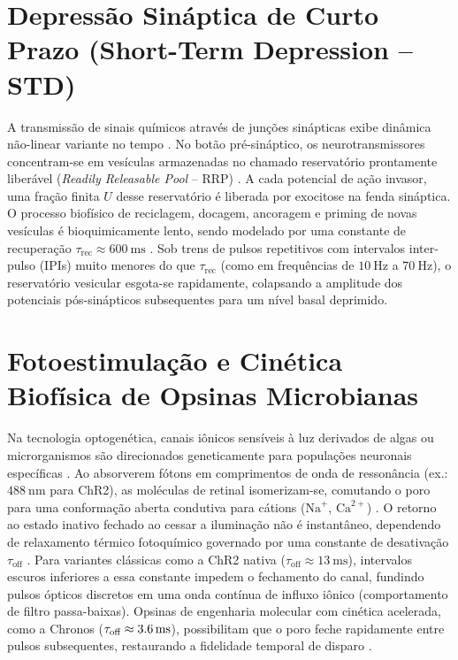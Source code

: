 \documentclass[11pt,a4paper,article,brazil]{abntex2}
\begin{document}
\begin{apendicesenv}
    \section{Depressão Sináptica de Curto Prazo (Short-Term Depression -- STD)}
    A transmissão de sinais químicos através de junções sinápticas exibe dinâmica não-linear variante no tempo \cite{dayan2001, gerstner2014}. No botão pré-sináptico, os neurotransmissores concentram-se em vesículas armazenadas no chamado reservatório prontamente liberável (\emph{Readily Releasable Pool} -- RRP) \cite{kandel2021}. A cada potencial de ação invasor, uma fração finita $U$ desse reservatório é liberada por exocitose na fenda sináptica. O processo biofísico de reciclagem, docagem, ancoragem e priming de novas vesículas é bioquimicamente lento, sendo modelado por uma constante de recuperação $\tau_{\text{rec}} \approx \qty{600}{\milli\second}$ \cite{tsodyks1997, tsodyks1998}. Sob trens de pulsos repetitivos com intervalos inter-pulso (IPIs) muito menores do que $\tau_{\text{rec}}$ (como em frequências de $\qty{10}{\hertz}$ a $\qty{70}{\hertz}$), o reservatório vesicular esgota-se rapidamente, colapsando a amplitude dos potenciais pós-sinápticos subsequentes para um nível basal deprimido.

    \section{Fotoestimulação e Cinética Biofísica de Opsinas Microbianas}
    Na tecnologia optogenética, canais iônicos sensíveis à luz derivados de algas ou microrganismos são direcionados geneticamente para populações neuronais específicas \cite{boyden2005, deisseroth2011}. Ao absorverem fótons em comprimentos de onda de ressonância (ex.: $\qty{488}{\nano\meter}$ para ChR2), as moléculas de retinal isomerizam-se, comutando o poro para uma conformação aberta condutiva para cátions ($\text{Na}^+$, $\text{Ca}^{2+}$) \cite{nagel2003}. O retorno ao estado inativo fechado ao cessar a iluminação não é instantâneo, dependendo de relaxamento térmico fotoquímico governado por uma constante de desativação $\tau_{\text{off}}$ \cite{nikolic2009, grossman2011}. Para variantes clássicas como a ChR2 nativa ($\tau_{\text{off}} \approx \qty{13}{\milli\second}$), intervalos escuros inferiores a essa constante impedem o fechamento do canal, fundindo pulsos ópticos discretos em uma onda contínua de influxo iônico (comportamento de filtro passa-baixas). Opsinas de engenharia molecular com cinética acelerada, como a Chronos ($\tau_{\text{off}} \approx \qty{3{,}6}{\milli\second}$), possibilitam que o poro feche rapidamente entre pulsos subsequentes, restaurando a fidelidade temporal de disparo \cite{klapoetke2014}.

\end{apendicesenv}

\newpage


\end{document}
